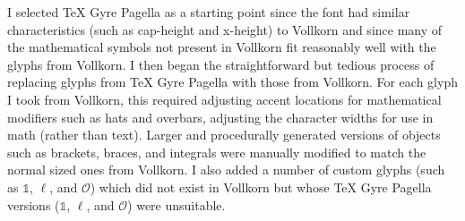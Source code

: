 \documentclass[]{report}
\theoremstyle{definition}
\newcommand{\bOne}{\mathbb{1}}
\begin{document}
I selected TeX Gyre Pagella as a starting point since the font had similar characteristics (such as cap-height and x-height) to Vollkorn and since many of the mathematical symbols not present in Vollkorn fit reasonably well with the glyphs from Vollkorn.
I then began the straightforward but tedious process of replacing glyphs from TeX Gyre Pagella with those from Vollkorn.
For each glyph I took from Vollkorn, this required adjusting accent locations for mathematical modifiers such as hats and overbars, adjusting the character widths for use in math (rather than text).
Larger and procedurally generated versions of objects such as brackets, braces, and integrals were manually modified to match the normal sized ones from Vollkorn.
I also added a number of custom glyphs (such as \( \bOne \), \( \ell \), and \( \mathcal{O}\)) which did not exist in Vollkorn but whose TeX Gyre Pagella versions ({$\bOne$}, {$\ell$}, and {$\mathcal{O}$}) were unsuitable.
\end{document}
